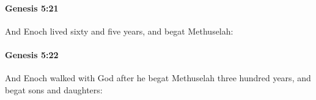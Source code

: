 		\paragraph{Genesis 5:21} %
			\label{GENESIS-5-21}

			And Enoch lived sixty and five years, and begat Methuselah:


		\paragraph{Genesis 5:22} %
			\label{GENESIS-5-22}

			And Enoch walked with God after he begat Methuselah three hundred years, and begat sons and daughters:


